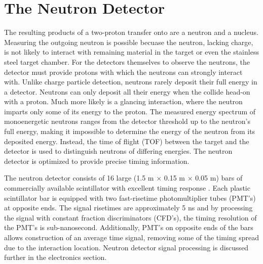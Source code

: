 \section{The Neutron Detector}

The resulting products of a two-proton transfer onto \GeTargets are a neutron and a \SeProducts nucleus.  Measuring the outgoing neutron is possible becuase the neutron, lacking charge, is not likely to interact with remaining material in the target or even the stainless steel target chamber.  For the detectors themselves to observe the neutrons, the detector must provide protons with which the neutrons can strongly interact with.  Unlike charge particle detection, neutrons rarely deposit their full energy in a detector.  Neutrons can only deposit all their energy when the collide head-on with a proton.  Much more likely is a glancing interaction, where the neutron imparts only some of its energy to the proton.  The measured energy spectrum of monoenergetic neutrons ranges from the detector threshold up to the neutron's full energy, making it impossible to determine the energy of the neutron from its deposited energy.  Instead, the time of flight (TOF) between the target and the detector is used to distinguish neutrons of differing energies.  The neutron detector is optimized to provide precise timing information.       

The neutron detector \cite{KolataNeutwall} consists of 16 large (1.5 m $\times$ 0.15 m $\times$ 0.05 m) bars of commercially available scintillator with excellent timing response \cite{BC408}.  Each plastic scintillator bar is equipped with two fast-risetime photomultiplier tubes (PMT's) at opposite ends.  The signal risetimes are approximately 5 ns and by processing the signal with constant fraction discriminators (CFD's), the timing resolution of the PMT's is sub-nanosecond.  Additionally, PMT's on opposite ends of the bars allows construction of an average time signal, removing some of the timing spread due to the interaction location.  Neutron detector signal processing is discussed further in the electronics section.

